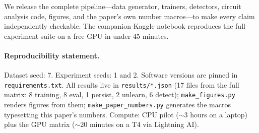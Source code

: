 \documentclass[11pt]{article}
\begin{document}
We release the complete pipeline---data generator, trainers, detectors,
circuit analysis code, figures, and the paper's own number macros---to make
every claim independently checkable. The companion Kaggle notebook
reproduces the full experiment suite on a free GPU in under 45 minutes.

\paragraph{Reproducibility statement.}
Dataset seed: 7. Experiment seeds: 1 and 2. Software versions are pinned
in \texttt{requirements.txt}. All results live in \texttt{results/*.json}
(17 files from the full matrix: 8 training, 8 eval, 1 persist, 2 unlearn,
6 detect); \texttt{make\_figures.py} renders figures from them;
\texttt{make\_paper\_numbers.py} generates the macros typesetting this
paper's numbers. Compute: CPU pilot ($\sim$3 hours on a laptop) plus the
GPU matrix ($\sim$20 minutes on a T4 via Lightning AI).
\end{document}
